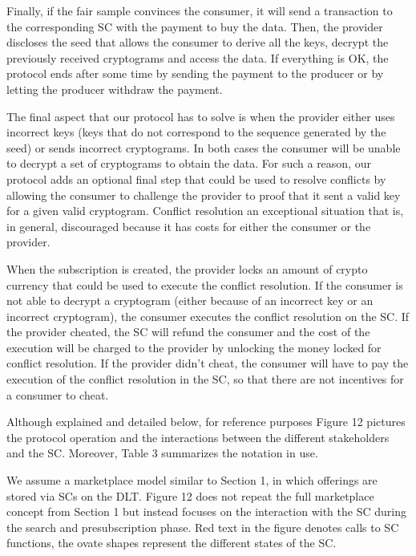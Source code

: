 \documentclass[]{article}
\begin{document}
	Finally, if the fair sample convinces the consumer, it will send a transaction to the corresponding SC with the payment to buy the data. Then, the provider discloses the seed that allows the consumer to derive all the keys, decrypt the previously received cryptograms and access the data. If everything is OK, the protocol ends after some time by sending the payment to the producer or by letting the producer withdraw the payment.

	The final aspect that our protocol has to solve is when the provider either uses incorrect keys (keys that do not correspond to the sequence generated by the seed) or sends incorrect cryptograms. In both cases the consumer will be unable to decrypt a set of cryptograms to obtain the data. For such a reason, our protocol adds an optional final step that could be used to resolve conflicts by allowing the consumer to challenge the provider to proof that it sent a valid key for a given valid cryptogram. Conflict resolution an exceptional situation that is, in general, discouraged because it has costs for either the consumer or the provider.

	When the subscription is created, the provider locks an amount of crypto currency that could be used to execute the conflict resolution. If the consumer is not able to decrypt a cryptogram (either because of an incorrect key or an incorrect cryptogram), the consumer executes the conflict resolution on the SC. If the provider cheated, the SC will refund the consumer and the cost of the execution will be charged to the provider by unlocking the money locked for conflict resolution. If the provider didn’t cheat, the consumer will have to pay the execution of the conflict resolution in the SC, so that there are not incentives for a consumer to cheat.

	Although explained and detailed below, for reference purposes Figure 12 pictures the protocol operation and the interactions between the different stakeholders and the SC. Moreover, Table 3 summarizes the notation in use.

	We assume a marketplace model similar to Section 1, in which offerings are stored via SCs on the DLT. Figure 12 does not repeat the full marketplace concept from Section 1 but instead focuses on the interaction with the SC during the search and presubscription phase. Red text in the figure denotes calls to SC functions, the ovate shapes represent the different states of the SC.
\end{document}

